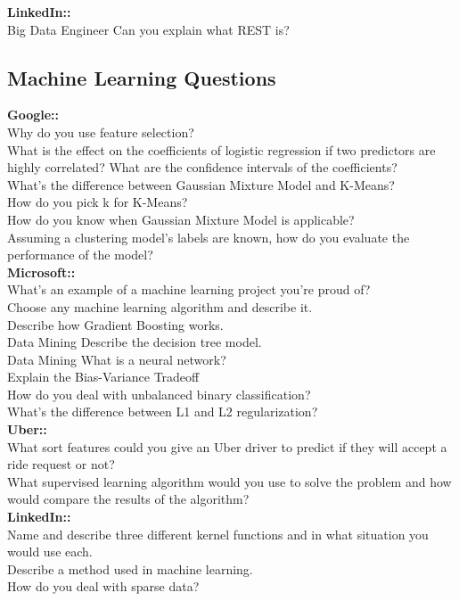 \documentclass[11pt]{article}
\begin{document}
{\bf LinkedIn::} \\
Big Data Engineer Can you explain what REST is?\\


\subsection{Machine Learning Questions}
{\bf Google:: }\\
Why do you use feature selection?\\
What is the effect on the coefficients of logistic regression if two predictors are highly correlated? What are the confidence intervals of the coefficients?\\
What’s the difference between Gaussian Mixture Model and K-Means?\\
How do you pick k for K-Means?\\
How do you know when Gaussian Mixture Model is applicable?\\
Assuming a clustering model’s labels are known, how do you evaluate the performance of the model?\\

{\bf Microsoft:: }\\
What’s an example of a machine learning project you’re proud of?\\
Choose any machine learning algorithm and describe it.\\
Describe how Gradient Boosting works.\\
Data Mining Describe the decision tree model.\\
Data Mining What is a neural network?\\
Explain the Bias-Variance Tradeoff\\
How do you deal with unbalanced binary classification?\\
What’s the difference between L1 and L2 regularization?\\

{\bf Uber:: }  \\
What sort features could you give an Uber driver to predict if they will accept a ride request or not? \\ 
What supervised learning algorithm would you use to solve the problem and how would compare the results of the algorithm?\\

{\bf LinkedIn:: }\\
Name and describe three different kernel functions and in what situation you would use each.\\
Describe a method used in machine learning.\\
How do you deal with sparse data?\\
\end{document}
